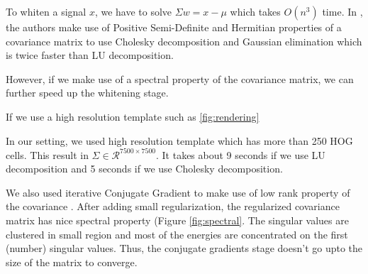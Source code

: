 \documentclass[10pt,twocolumn,letterpaper]{article}
\begin{document}
To whiten a signal $x$, we have to solve $\Sigma w = x - \mu$ which takes $O(n^3)$ time. In \cite{Hariharan12}, the authors make use of Positive Semi-Definite and Hermitian properties of a covariance matrix to use Cholesky decomposition and Gaussian elimination which is twice faster than LU decomposition.

However, if we make use of a spectral property of the covariance matrix, we can further speed up the whitening stage.
  
  If we use a high resolution template such as \ref{fig:rendering}




In our setting, we used high resolution template which has more than 250 HOG cells. This result in $\Sigma \in \mathcal{R}^{7500 \times 7500}$. It takes about 9 seconds if we use LU decomposition and 5 seconds if we use Cholesky decomposition.  %

We also used iterative Conjugate Gradient to make use of low rank property of the covariance \cite{Gharbi12}. After adding small regularization, the regularized covariance matrix has nice spectral property (Figure \ref{fig:spectral}. The singular values are clustered in small region and most of the energies are concentrated on the first (number) singular values. Thus, the conjugate gradients stage doesn't go upto the size of the matrix to converge.
\end{document}
